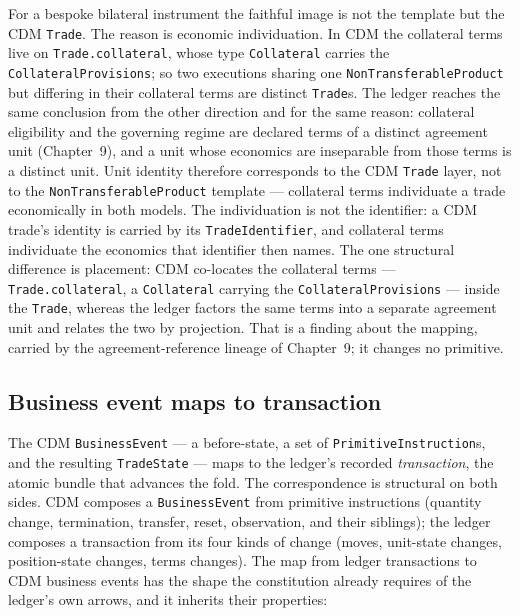 \documentclass[11pt,a4paper]{article}
\begin{document}
For a bespoke bilateral instrument the faithful image is not the template but
the CDM \texttt{Trade}. The reason is economic individuation. In CDM the
collateral terms live on \texttt{Trade.collateral}, whose type
\texttt{Collateral} carries the \texttt{CollateralProvisions}; so two executions
sharing one \texttt{NonTransferableProduct} but differing in their collateral
terms are distinct \texttt{Trade}s. The ledger reaches the same conclusion from
the other direction and for the same reason: collateral eligibility and the
governing regime are declared terms of a distinct agreement unit
(Chapter~9), and a unit whose economics are inseparable from those terms is a
distinct unit. Unit identity therefore corresponds to the CDM \texttt{Trade}
layer, not to the \texttt{NonTransferableProduct} template --- collateral terms
individuate a trade economically in both models. The individuation is not the
identifier: a CDM trade's identity is carried by its \texttt{TradeIdentifier},
and collateral terms individuate the economics that identifier then names. The
one structural difference is placement: CDM co-locates the collateral terms ---
\texttt{Trade.collateral}, a \texttt{Collateral} carrying the
\texttt{CollateralProvisions} --- inside the \texttt{Trade}, whereas the ledger
factors the same terms into a separate agreement unit and relates the two by
projection. That is a finding about the mapping, carried by the
agreement-reference lineage of Chapter~9; it changes no primitive.

\subsection{Business event maps to transaction}

The CDM \texttt{BusinessEvent} --- a before-state, a set of
\texttt{PrimitiveInstruction}s, and the resulting \texttt{TradeState} --- maps to
the ledger's recorded \emph{transaction}, the atomic bundle that advances the
fold. The correspondence is structural on both sides. CDM composes a
\texttt{BusinessEvent} from primitive instructions (quantity change,
termination, transfer, reset, observation, and their siblings); the ledger
composes a transaction from its four kinds of change (moves, unit-state changes,
position-state changes, terms changes). The map from ledger transactions to CDM
business events has the shape the constitution already requires of the ledger's
own arrows, and it inherits their properties:
\end{document}
